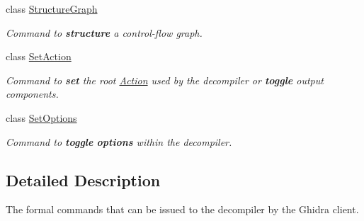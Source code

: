\begin{DoxyCompactItemize}
class \mbox{\hyperlink{class_structure_graph}{Structure\+Graph}}
\begin{DoxyCompactList}\small\item\em Command to {\bfseries{structure}} a control-\/flow graph. \end{DoxyCompactList}\item 
class \mbox{\hyperlink{class_set_action}{Set\+Action}}
\begin{DoxyCompactList}\small\item\em Command to {\bfseries{set}} the {\itshape root} \mbox{\hyperlink{class_action}{Action}} used by the decompiler or {\bfseries{toggle}} output components. \end{DoxyCompactList}\item 
class \mbox{\hyperlink{class_set_options}{Set\+Options}}
\begin{DoxyCompactList}\small\item\em Command to {\bfseries{toggle}} {\bfseries{options}} within the decompiler. \end{DoxyCompactList}\end{DoxyCompactItemize}


\subsection{Detailed Description}
The formal commands that can be issued to the decompiler by the Ghidra client. 

